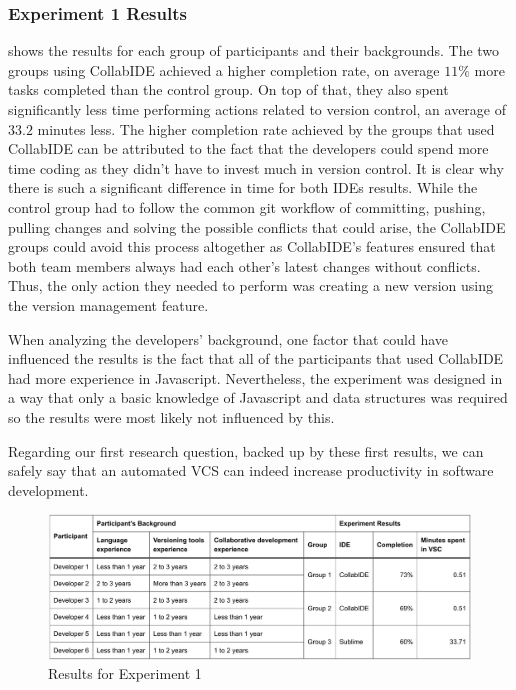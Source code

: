 \subsubsection{Experiment 1 Results}

 shows the results for each group of participants and their 
backgrounds. The two groups using CollabIDE achieved a higher completion rate, on average $11\%$ 
more tasks completed than the control group. On top of that, they 
also spent significantly less time performing actions related to version control, an average of $33.2$  
minutes less. The higher completion rate achieved by the groups 
that used CollabIDE can be attributed to the fact that the developers could spend more time coding as 
they didn't have to invest much in version control. It is clear why there is such a significant difference in 
time for both IDEs results. While the control group had to follow the common git workflow of committing, 
pushing, pulling changes and solving the possible conflicts that could arise, the CollabIDE groups could 
avoid this process altogether as CollabIDE’s features ensured that both team members always had 
each other's latest changes without conflicts. Thus, the only action they needed to perform was 
creating a new version using the version management feature.

When analyzing the developers' background, one factor that could have influenced the results is the 
fact that all of the participants that used CollabIDE had more experience in Javascript. Nevertheless, 
the experiment was designed in a way that only a basic knowledge of Javascript and data structures 
was required so the results were most likely not influenced by this.

Regarding our first research question, backed up by these first results, we can safely say that an 
automated \ac{VCS} can indeed increase productivity in software development.

\begin{figure}[htbp]
  \centering
  \includegraphics[width=1\textwidth]{img/resultsTableCollaborative}
  \caption{Results for Experiment 1}
  \label{fig:resultsTableCollaborative}
\end{figure}

